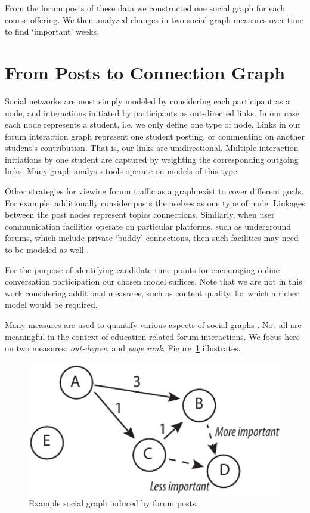 From the forum posts of these data we constructed one social graph for
each course offering. We then analyzed changes in two social graph
measures over time to find `important' weeks.

\section{From Posts to Connection Graph}

Social networks are most simply modeled by considering each
participant as a node, and interactions initiated by participants as
out-directed links. In our case each node represents a student,
i.e. we only define one type of node. Links in our forum interaction
graph represent one student posting, or commenting on another
student's contribution. That is, our links are
unidirectional. Multiple interaction initiations by one student are
captured by weighting the corresponding outgoing links. Many graph
analysis tools operate on models of this type.

Other strategies for viewing forum traffic as a graph exist to cover
different goals. For example, \cite{Anwar2013} additionally consider
posts themselves as one type of node. Linkages between the post nodes
represent topics connections. Similarly, when user communication
facilities operate on particular platforms, such as underground
forums, which include private `buddy' connections, then such
facilities may need to be modeled as well \cite{Moto2011}.

For the purpose of identifying candidate time points for encouraging
online conversation participation our chosen model suffices. Note that
we are not in this work considering additional measures, such as
content quality, for which a richer model would be required.

Many measures are used to quantify various aspects of social graphs
\cite{hann2005, lesk14}. Not all are meaningful in the context of
education-related forum interactions. We focus here on two measures:
{\em out-degree}, and {\em page rank}. Figure~\ref{fig:forumGraph}
illustrates.

\begin{figure}[htp]
       \centering
       \includegraphics[width=1.0\textwidth]{Figs/forumNetworkExample.pdf}
       \caption{\textnormal{Example social graph induced by forum posts.}}
       \label{fig:forumGraph}
\end{figure}

